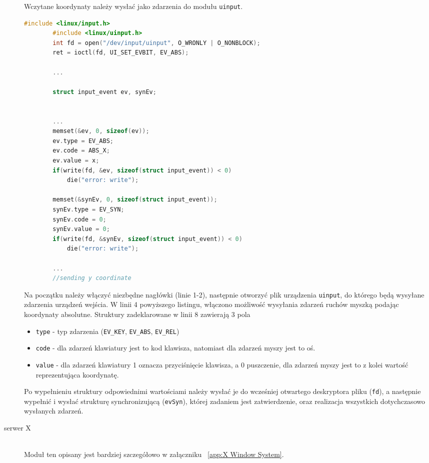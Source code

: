\begin{description}
		Wczytane koordynaty należy wysłać jako zdarzenia do modułu \lstinline|uinput|. 
		
		\begin{lstlisting}[language=c]
		#include <linux/input.h>
		#include <linux/uinput.h>
		int fd = open("/dev/input/uinput", O_WRONLY | O_NONBLOCK);
		ret = ioctl(fd, UI_SET_EVBIT, EV_ABS);
		
		...

		struct input_event ev, synEv;
	

		...
		memset(&ev, 0, sizeof(ev));
		ev.type = EV_ABS;
		ev.code = ABS_X;
		ev.value = x;
		if(write(fd, &ev, sizeof(struct input_event)) < 0)
            die("error: write");  

		memset(&synEv, 0, sizeof(struct input_event));
        synEv.type = EV_SYN;
        synEv.code = 0;
        synEv.value = 0;
        if(write(fd, &synEv, sizeof(struct input_event)) < 0)
            die("error: write");

		...
		//sending y coordinate


		\end{lstlisting}
		Na początku należy włączyć niezbędne nagłówki (linie 1-2), następnie otworzyć plik urządzenia \lstinline|uinput|, do którego będą wysyłane zdarzenia urządzeń wejścia. W linii 4 powyższego listingu, włączono możliwość wysyłania zdarzeń ruchów myszką podając koordynaty absolutne. Struktury zadeklarowane w linii 8 zawierają 3 pola 
		\begin{itemize}
			\item \lstinline|type| - typ zdarzenia (\lstinline|EV_KEY|, \lstinline|EV_ABS|, \lstinline|EV_REL|)		
			\item \lstinline|code| - dla zdarzeń klawiatury jest to kod klawisza, natomiast dla zdarzeń myszy jest to oś.
			\item \lstinline|value| - dla zdarzeń klawiatury 1 oznacza przyciśnięcie klawisza, a 0 puszczenie, dla zdarzeń myszy jest to z kolei wartość reprezentująca koordynatę.
		\end{itemize}
		Po wypełnieniu struktury odpowiednimi wartościami należy wysłać je do wcześniej otwartego deskryptora pliku (\lstinline|fd|), a następnie wypełnić i wysłać strukturę synchronizującą (\lstinline|evSyn|), której zadaniem jest zatwierdzenie, oraz realizacja wszystkich dotychczasowo wysłanych zdarzeń. 
	\item[serwer X] \hfill \\
		Moduł ten opisany jest bardziej szczegółowo w załączniku ~\ref{app:X Window System}.


\end{description}



